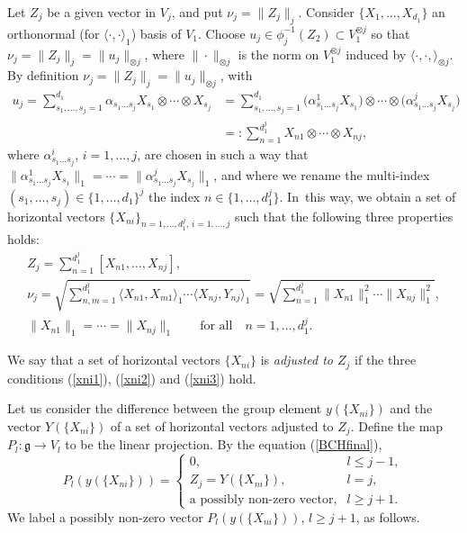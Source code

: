 \documentclass[pdftex]{sigma}
\numberwithin{equation}{section}
\newcommand{\g}{\mathfrak{g}}
\begin{document}
Let $Z_j$ be a given vector in $V_j$,
and put $\nu_j=\|Z_j\|_j$.
 Consider $\{X_1,\dots,X_{d_1}\}$ an orthonormal (for $\langle\cdot,\cdot\rangle_1$) basis of $V_1$.
 Choose $u_j\in \phi_j^{-1}(Z_2)\subset V_1^{\otimes j}$ so that $\nu_j=\|Z_j\|_j=\|u_j\|_{\otimes j}$,
 where $\|\cdot\|_{\otimes j}$ is the norm on $V_1^{\otimes j}$ induced by $\langle\cdot,\cdot,\rangle_{\otimes j}$.
 By definition $\nu_j=\|Z_j\|_j=\|u_j\|_{\otimes j}$,
 with
 \begin{align*}
 u_j=\sum_{s_1,\dots,s_j=1}^{d_1}\alpha_{s_1\dots s_j}X_{s_1}\otimes\cdots\otimes X_{s_j}
 &=\sum_{s_1,\dots,s_j=1}^{d_1}\big(\alpha_{s_1\dots s_j}^1X_{s_1}\big)\otimes\cdots\otimes \big(\alpha_{s_1\dots s_j}^j X_{s_j}\big)
 \\
 &=:\sum_{n=1}^{d_1^j}X_{n1}\otimes \cdots\otimes X_{nj},
 \end{align*}
 where $\alpha_{s_1\dots s_j}^i$, $i=1,\dots,j$, are chosen in such a way that $\big\|\alpha_{s_1\dots s_j}^1X_{s_1}\big\|_1=\cdots =\big\|\alpha_{s_1\dots s_j}^jX_{s_j}\big\|_1$,
 and where we rename the multi-index $(s_1,\dots,s_j)\in\{1,\dots,d_1\}^j$ the index $n\in\big\{1,\dots,d_1^j\big\}$.
 In~this way,
we obtain a set of horizontal vectors $\{X_{ni}\}_{n=1,\dots,d_1^j,\,i=1,\dots,j}$ such that the following three properties holds:
 \begin{gather}
Z_j=\sum_{n=1}^{d_1^j}[X_{n1},\dots,X_{nj}],\label{xni1}
 \\
\nu_j=\sqrt{\sum_{n,m=1}^{d_1^j}\langle X_{n1},X_{m1}\rangle_1\cdots\langle X_{nj},Y_{nj}\rangle_1}=\sqrt{\sum_{n=1}^{d_1^j}\|X_{n1}\|_1^2\cdots\|X_{nj}\|_1^2},\label{xni2}
 \\
\|X_{n1}\|_1=\cdots=\|X_{nj}\|_1\qquad \text{for all}\quad n=1,\dots,d_1^j.\label{xni3}
\end{gather}

\begin{Definition}
 We say that a set of horizontal vectors $\{X_{ni}\}$ is \textit{adjusted to $Z_j$} if the three conditions (\ref{xni1}),
 (\ref{xni2}) and (\ref{xni3}) hold.
\end{Definition}

Let us consider the difference between the group element $y(\{X_{ni}\})$ and the vector $Y(\{X_{ni}\})$ of a set of horizontal vectors adjusted to $Z_j$.
Define the map $P_l\colon \g\to V_l$ to be the linear projection.
By the equation (\ref{BCHfinal}),
\[
 P_l(y(\{X_{ni}\}))=\begin{cases}
 0, & l\leq j-1,\\
Z_j=Y(\{X_{ni}\}), & l=j,\\
\text{a possibly non-zero vector}, & l\geq j+1.
\end{cases}
\]
We label a possibly non-zero vector $P_l(y(\{X_{ni}\}))$, $l\geq j+1$, as follows.
\end{document}
